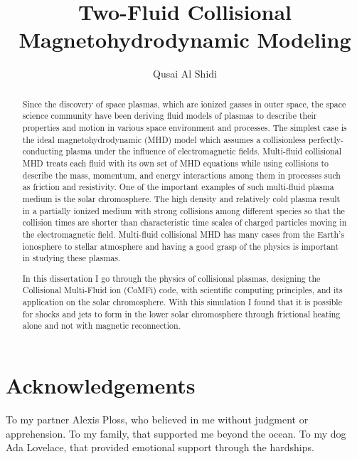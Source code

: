 \documentclass[12pt,upcase]{umlthesis}
\begin{document}
\title{Two-Fluid Collisional Magnetohydrodynamic Modeling}
\author{Qusai Al Shidi}
\maketitle

\begin{abstract}
	Since the discovery of space plasmas, which are ionized gasses in outer space, the space science community have been deriving fluid models of plasmas to describe their properties and motion in various space environment and processes. The simplest case is the ideal magnetohydrodynamic (MHD) model which assumes a collisionless perfectly-conducting plasma under the influence of electromagnetic fields. Multi-fluid collisional MHD treats each fluid with its own set of MHD equations while using collisions to describe the mass, momentum, and energy interactions among them in processes such as friction and resistivity. One of the important examples of such multi-fluid plasma medium is the solar chromosphere. The high density and relatively cold plasma result in a partially ionized medium with strong collisions among different species so that the collision times are shorter than characteristic time scales of charged particles moving in the electromagnetic field. Multi-fluid collisional MHD has many cases from the Earth's ionosphere to stellar atmosphere and having a good grasp of the physics is important in studying these plasmas.

	In this dissertation I go through the physics of collisional plasmas, designing the Collisional Multi-Fluid ion (CoMFi) code, with scientific computing principles, and its application on the solar chromosphere. With this simulation I found that it is possible for shocks and jets to form in the lower solar chromosphere through frictional heating alone and not with magnetic reconnection.
\end{abstract}
\chapter*{Acknowledgements}
To my partner Alexis Ploss, who believed in me without judgment or apprehension. To my family, that supported me beyond the ocean. To my dog Ada Lovelace, that provided emotional support through the hardships.
\end{document}
